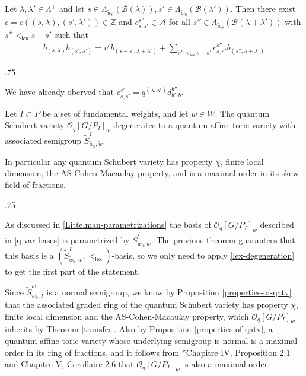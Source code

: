 \documentclass[11pt,fleqn]{article}
\makeatletter
\renewenvironment{proof}[1][\textit{Proof}]{\par
  \pushQED{\qed}%
  \normalfont \topsep.75\paraskip\relax
  \trivlist
  \item[\hskip\labelsep
        \itshape
    #1\@addpunct{.}]\ignorespaces
}{%
  \popQED\endtrivlist\@endpefalse
}
\newcommand\ZZ{\mathbb Z}
\newcommand\A{\mathcal A}
\newcommand\B{\mathcal B}
\renewcommand\O{\mathcal O}
\newcommand\lex{\mathsf{lex}}
\makeatother
\begin{document}
\begin{Proposition*}
Let $\lambda, \lambda' \in \Lambda^+$ and let $s \in \Lambda_{\tilde w_0}
(\B(\lambda)), s' \in \Lambda_{\tilde w_0}(\B(\lambda'))$. Then there exist 
$c = c((s,\lambda),(s',\lambda')) \in \ZZ$ and $c_{s, s'}^{s''} \in \A$ 
for all $s'' \in \Lambda_{\tilde w_0}(\B(\lambda + \lambda'))$ with $s'' 
<_{\lex} s+ s'$ such that 
\begin{align*}
\label{product-formula} 
b_{(s, \lambda)} b_{(s', \lambda')}
  = v^c b_{(s+s', \lambda + \lambda')} 
    + \sum_{s'' <_{\lex} s+s'} c_{s,s'}^{s''} b_{(s'', \lambda + \lambda')}
\end{align*} 
\end{Proposition*} 
\begin{proof}
We have already oberved that $c_{s,s'}^{s'} = q^{(\lambda, \lambda')} 
d_{b',b}^{b''}$. 
\end{proof}


\begin{Theorem}
\label{Schubert-deg}
Let $I \subset P$ be a set of fundamental weights, and let $w \in W$.
The quantum Schubert variety $\O_q[G/P_I]_w$ degenerates to a quantum affine toric 
variety with associated semigroup $\tilde S^I_{\tilde w_0, \tilde w}$. 

In particular any quantum Schubert variety has property $\chi$, finite local dimension, 
the AS-Cohen-Macaulay property, and is a maximal order in its skew-field of fractions.
\end{Theorem}
\begin{proof}
As discussed in \ref{Littelman-parametrizations} the basis of $\O_q[G/P_I]_w$ described
in \ref{q-var-bases} is parametrized by $\tilde S^I_{\tilde w_0, w}$. The previous theorem
guarantees that this basis is a $(\tilde S^I_{\tilde w_0, w},<_{\lex})$-basis, so we
only need to apply \ref{lex-degeneration} to get the first part of the statement.

Since $\tilde S^w_{w_0, I}$ is a normal semigroup, we know by Proposition 
\ref{properties-of-qatv} that the associated graded ring of the quantum Schubert variety
has property $\chi$, finite local dimension and the AS-Cohen-Macaulay property, which 
$\O_q[G/P_I]_w$ inherits by Theorem \ref{transfer}. Also by Proposition 
\ref{properties-of-qatv}, a quantum affine toric variety whose underlying semigroup is 
normal is a maximal order in its ring of fractions, and it follows from 
\cite{Mau}*{Chapitre IV, Proposition 2.1 and Chapitre V, Corollaire 2.6} that 
$\O_q[G/P_I]_w$ is also a maximal order. 
\end{proof}
\end{document}

